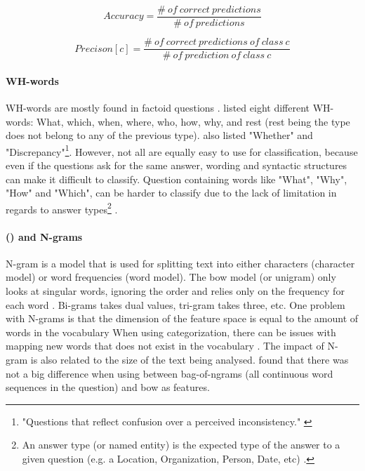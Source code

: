 \begin{equation}\label{eq:accuracy}
Accuracy = \frac{\#~of~correct~predictions}{\#~of~predictions}
\end{equation}

\begin{equation}\label{eq:precision}
Precison[c] = \frac{\#~of~correct~predictions~of~class~c}{\#~of~prediction~of~class~c}
\end{equation}

\paragraph{WH-words}
\label{sec:wh_words}
WH-words are mostly found in factoid questions \cite{Lopez2011}. 
\textcite{Huang2008} listed eight different WH-words: What, which, when, where, who, how, why, and rest (rest being the type does not belong to any of the previous type). 
\textcite{Letovsky1987} also listed "Whether" and "Discrepancy"\footnote{
	"Questions that reflect confusion over a perceived inconsistency." \cite[p.~5]{Letovsky1987}
}.
However, not all are equally easy to use for classification, because even if the questions ask for the same answer, wording and syntactic structures can make it difficult to classify.
Question containing words like "What", "Why", "How" and "Which", can be harder to classify due to the lack of limitation in regards to answer types\footnote{
	An answer type (or named entity) is the expected type of the answer to a given question (e.g. a Location, Organization, Person, Date, etc) \cite{Heie2012, Lopez2011, Sasaki2005, Yen2013}. 
} \cite{Huang2008, Lopez2011}.


\paragraph[Bag-of-words and N-grams]{ () and N-grams}
\label{sec:bow}
N-gram is a model that is used for splitting text into either characters (character model) or word frequencies (word model). 
The \gls{bow} model (or unigram) only looks at singular words, ignoring the order and relies only on the frequency for each word \cite{Manning2008, Russell2013}. 
Bi-grams takes dual values, tri-gram takes three, etc.
\vspace{0.5em}\newline
One problem with N-grams is that the dimension of the feature space is equal to the amount of words in the vocabulary \cite{Russell2013, Loni2011}
When using categorization, there can be issues with mapping new words that does not exist in the vocabulary \cite{Yen2013}.
The impact of N-gram is also related to the size of the text being analysed. 
\textcite{Zhang2003} found that there was not a big difference when using between bag-of-ngrams (all continuous word sequences in the question) and \gls{bow} as features.


